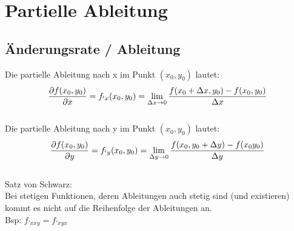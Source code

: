 



\chapter{Partielle Ableitung}
\section{Änderungsrate / Ableitung}
Die partielle Ableitung nach x im Punkt $(x_0,y_0)$ lautet:
\[
	\frac{\partial f(x_0,y_0)}{\partial x} = f_{'x}(x_0,y_0)=\lim\limits_{\Delta x \to 0}{\frac{f(x_0+\Delta x,y_0)-f(x_0,y_0)}{\Delta x}}
\]
\\
Die partielle Ableitung nach y im Punkt $(x_0,y_0)$ lautet:
\[
	\frac{\partial f(x_0,y_0)}{\partial y} = f_{'y}(x_0,y_0)=\lim\limits_{\Delta y \to 0}{\frac{f(x_0,y_0+\Delta y)-f(x_0y_0)}{\Delta y}}
\]
\\
Satz von Schwarz:\\
Bei stetigen Funktionen, deren Ableitungen auch stetig sind (und existieren) kommt es nicht auf die Reihenfolge der Ableitungen an.\\
Bsp: $f_{'xxy}=f_{'xyx}$